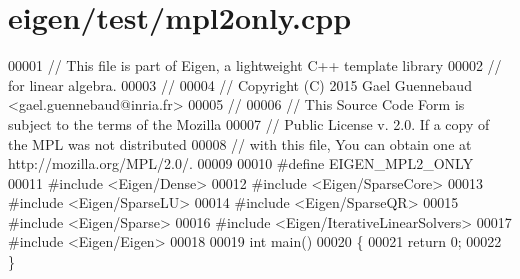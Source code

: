 \hypertarget{eigen_2test_2mpl2only_8cpp_source}{}\section{eigen/test/mpl2only.cpp}
\label{eigen_2test_2mpl2only_8cpp_source}

\begin{DoxyCode}
00001 \textcolor{comment}{// This file is part of Eigen, a lightweight C++ template library}
00002 \textcolor{comment}{// for linear algebra.}
00003 \textcolor{comment}{//}
00004 \textcolor{comment}{// Copyright (C) 2015 Gael Guennebaud <gael.guennebaud@inria.fr>}
00005 \textcolor{comment}{//}
00006 \textcolor{comment}{// This Source Code Form is subject to the terms of the Mozilla}
00007 \textcolor{comment}{// Public License v. 2.0. If a copy of the MPL was not distributed}
00008 \textcolor{comment}{// with this file, You can obtain one at http://mozilla.org/MPL/2.0/.}
00009 
00010 \textcolor{preprocessor}{#define EIGEN\_MPL2\_ONLY}
00011 \textcolor{preprocessor}{#include <Eigen/Dense>}
00012 \textcolor{preprocessor}{#include <Eigen/SparseCore>}
00013 \textcolor{preprocessor}{#include <Eigen/SparseLU>}
00014 \textcolor{preprocessor}{#include <Eigen/SparseQR>}
00015 \textcolor{preprocessor}{#include <Eigen/Sparse>}
00016 \textcolor{preprocessor}{#include <Eigen/IterativeLinearSolvers>}
00017 \textcolor{preprocessor}{#include <Eigen/Eigen>}
00018 
00019 \textcolor{keywordtype}{int} main()
00020 \{
00021   \textcolor{keywordflow}{return} 0;
00022 \}
\end{DoxyCode}
